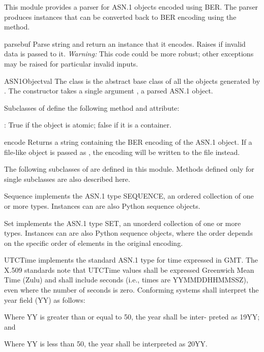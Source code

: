 \documentclass{howto}
\begin{document}
This module provides a parser for {ASN.1} objects encoded using
{BER}.  The parser produces  instances that can be
converted back to {BER} encoding using the  method.

\begin{funcdesc}{parse}{buf}
Parse string  and return an  instance that
it encodes.  Raises  if invalid data is passed
to it.  \emph{Warning:} This code could be more robust; other
exceptions may be raised for particular invalid inputs.
\end{funcdesc}

\begin{classdesc}{ASN1Object}{val}
The  class is the abstract base class of all the
objects generated by .  The constructor takes a single
argument , a parsed ASN.1 object.

Subclasses of  define the following method and
attribute: 

: True if the object is atomic; false if it is a
container. 

\begin{methoddesc}{encode}{}
Returns a string containing the BER encoding of the ASN.1 object.  If
a file-like object is passed as , the encoding will be written
to the file instead.
\end{methoddesc}

\end{classdesc}

The following subclasses of  are defined in this
module.  Methods defined only for single subclasses are also described
here.

\begin{classdesc}{Sequence}{}
 implements the ASN.1 type SEQUENCE, an ordered
collection of one or more types.  Instances can are also Python
sequence objects.
\end{classdesc}

\begin{classdesc}{Set}{}
 implements the ASN.1 type SET, an unorderd collection of
one or more types.  Instances can are also Python sequence objects,
where the order depends on the specific order of elements in the
original encoding.
\end{classdesc}

\begin{classdesc}{UTCTime}{}
 implements the standard ASN.1 type for time expressed
in GMT.  The X.509 standards note that UTCTime values shall be expressed
Greenwich Mean Time (Zulu) and shall include seconds (i.e., times are
YYMMDDHHMMSSZ), even where the number of seconds is zero.  Conforming
systems shall interpret the year field (YY) as follows:

Where YY is greater than or equal to 50, the year shall be inter-
preted as 19YY; and

Where YY is less than 50, the year shall be interpreted as 20YY.
\end{classdesc}
\end{document}
